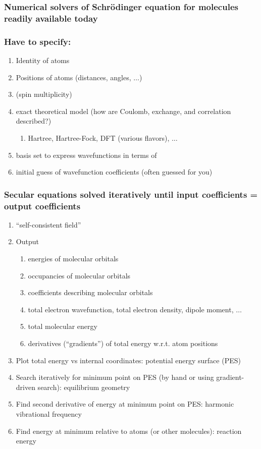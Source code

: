 \documentclass[11pt]{article}
\begin{document}
\subsubsection{Numerical solvers of Schr\"{o}dinger equation for molecules readily available today}
\label{sec:org1b9c863}
\subsubsection{Have to specify:}
\label{sec:org4ed4438}
\begin{enumerate}
\item Identity of atoms
\item Positions of atoms (distances, angles, \(\ldots\))
\item (spin multiplicity)
\item exact theoretical model (how are Coulomb, exchange, and correlation described?)
\begin{enumerate}
\item Hartree, Hartree-Fock, DFT (various flavors), \(\ldots\)
\end{enumerate}

\item basis set to express wavefunctions in terms of
\item initial guess of wavefunction coefficients (often guessed for you)
\end{enumerate}
\subsubsection{Secular equations solved iteratively until input coefficients = output coefficients}
\label{sec:orge6bdc6d}
\begin{enumerate}
\item ``self-consistent field''
\item Output
\begin{enumerate}
\item energies of molecular orbitals
\item occupancies of molecular orbitals
\item coefficients describing molecular orbitals
\item total electron wavefunction, total electron density, dipole moment, \(\ldots\)
\item total molecular energy
\item derivatives (``gradients'') of total energy w.r.t. atom positions
\end{enumerate}
\item Plot total energy vs internal coordinates: potential energy surface (PES)
\item Search iteratively for minimum point on PES (by hand or using gradient-driven search): equilibrium geometry
\item Find second derivative of energy at minimum point on PES: harmonic vibrational frequency
\item Find energy at minimum relative to atoms (or other molecules): reaction energy
\end{enumerate}
\end{document}
